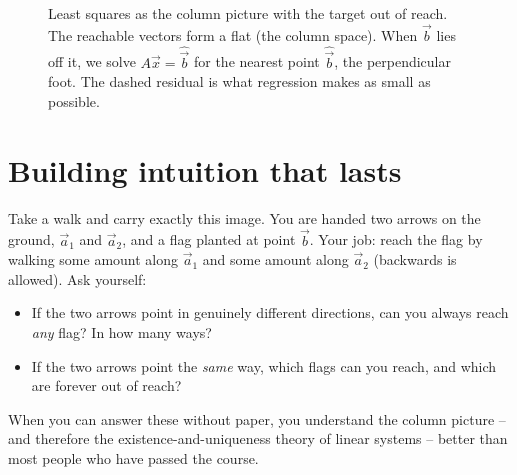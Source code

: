 \begin{figure}[H]
\centering
{}
\caption{Least squares as the column picture with the target out of reach.
The reachable vectors form a flat (the column space). When $\vec b$ lies off
it, we solve $A\vec x=\hat{\vec b}$ for the nearest point $\hat{\vec b}$, the
perpendicular foot. The dashed residual is what regression makes as small as
possible.}
\label{ch06:leastsq}
\end{figure}

\section{Building intuition that lasts}

\begin{walkbox}
Take a walk and carry exactly this image. You are handed two arrows on the
ground, $\vec a_1$ and $\vec a_2$, and a flag planted at point $\vec b$. Your
job: reach the flag by walking some amount along $\vec a_1$ and some amount
along $\vec a_2$ (backwards is allowed). Ask yourself:
\begin{itemize}
  \item If the two arrows point in genuinely different directions, can you
  always reach \emph{any} flag? In how many ways?
  \item If the two arrows point the \emph{same} way, which flags can you
  reach, and which are forever out of reach?
\end{itemize}
When you can answer these without paper, you understand the column picture --
and therefore the existence-and-uniqueness theory of linear systems -- better
than most people who have passed the course.
\end{walkbox}

